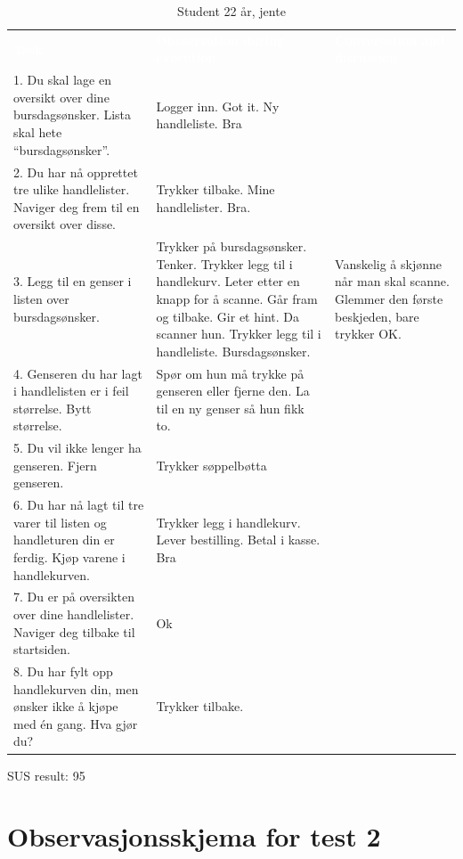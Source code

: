 \begin{table}[H]
    \caption{Student 22 år, jente}
    \label{tab:observasjon1_5}
    \centering
    \begin{tabular}{L{15em}  L{15em} L{15em}}
        \textbf{\textcolor{white}{Task}} & \textbf{\textcolor{white}{Obeservation during execution}} & \textbf{\textcolor{white}{Conversation and discussion}}\\
        1. Du skal lage en oversikt over dine bursdagsønsker. Lista skal hete “bursdagsønsker”. & Logger inn. Got it. Ny handleliste. Bra & \\
        2. Du har nå opprettet tre ulike handlelister. Naviger deg frem til en oversikt over disse. & Trykker tilbake. Mine handlelister. Bra. &  \\
        3. Legg til en genser i listen over bursdagsønsker. & Trykker på bursdagsønsker. Tenker. Trykker legg til i handlekurv. Leter etter en knapp for å scanne. Går fram og tilbake. Gir et hint. Da scanner hun. Trykker legg til i handleliste. Bursdagsønsker. & Vanskelig å skjønne når man skal scanne. Glemmer den første beskjeden, bare trykker OK.\\
        4. Genseren du har lagt i handlelisten er i feil størrelse. Bytt størrelse. & Spør om hun må trykke på genseren eller fjerne den. La til en ny genser så hun fikk to. & \\
        5. Du vil ikke lenger ha genseren. Fjern genseren. & Trykker søppelbøtta & \\
        6. Du har nå lagt til tre varer til listen og handleturen din er ferdig. Kjøp varene i handlekurven. & Trykker legg i handlekurv. Lever bestilling. Betal i kasse. Bra &\\
        7. Du er på oversikten over dine handlelister. Naviger deg tilbake til startsiden. & Ok & \\
        8. Du har fylt opp handlekurven din, men ønsker ikke å kjøpe med én gang. Hva gjør du? & Trykker tilbake. & \\
    \end{tabular}
\end{table}

\noindent SUS result: 95

\newpage
\section{\textcolor[HTML]{D32F2F}{Observasjonsskjema for test 2}} \label{App:AppendixC}

